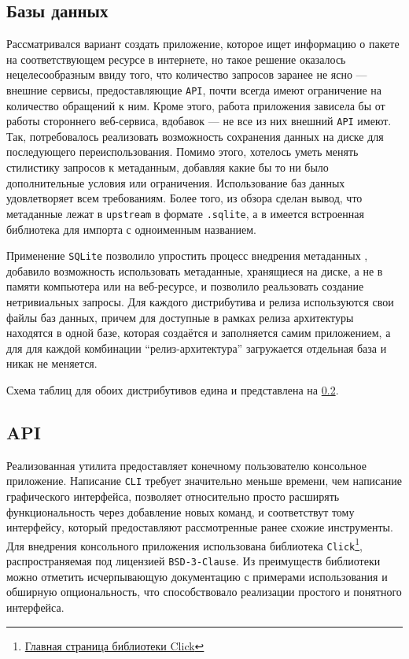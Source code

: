 \subsection{Базы данных}
Рассматривался вариант создать приложение, которое ищет информацию о пакете на соответствующем ресурсе в интернете, но такое решение оказалось нецелесообразным ввиду того, что количество запросов заранее не ясно --- внешние сервисы, предоставляющие \texttt{API}, почти всегда имеют ограничение на количество обращений к ним. Кроме этого, работа приложения зависела бы от работы стороннего веб-сервиса, вдобавок --- не все из них внешний \texttt{API} имеют. Так, потребовалось реализовать возможность сохранения данных на диске для последующего переиспользования.
Помимо этого, хотелось уметь менять стилистику запросов к метаданным, добавляя какие бы то ни было дополнительные условия или ограничения. Использование баз данных удовлетворяет всем требованиям. Более того, из обзора сделан вывод, что метаданные {\fedora} лежат в \texttt{upstream} в формате \texttt{.sqlite}, а в {\python} имеется встроенная библиотека для импорта с одноименным названием.

Применение \texttt{SQLite} позволило упростить процесс внедрения метаданных {\fedora}, добавило возможность использовать метаданные, хранящиеся на диске, а не в памяти компьютера или на веб-ресурсе, и позволило реальзовать создание нетривиальных запросы.
Для каждого дистрибутива и релиза используются свои файлы баз данных, причем для {\ubuntu} доступные в рамках релиза архитектуры находятся в одной базе, которая создаётся и заполняется самим приложением, а для {\fedora} для каждой комбинации \enquote{релиз-архитектура} загружается отдельная база и никак не меняется.

Схема таблиц для обоих дистрибутивов едина и представлена на \ref{}.

\subsection{API}
Реализованная утилита предоставляет конечному пользователю консольное приложение.
Написание \texttt{CLI} требует значительно меньше времени, чем написание графического интерфейса, позволяет относительно просто расширять функциональность через добавление новых команд, и соответствут тому интерфейсу, который предоставляют рассмотренные ранее схожие инструменты.
Для внедрения консольного приложения использована библиотека \texttt{Click}\footnote{\href{https://click.palletsprojects.com/en/8.1.x/}{Главная страница библиотеки Click}}, распространяемая под лицензией \texttt{BSD-3-Clause}.
Из преимуществ библиотеки можно отметить исчерпывающую документацию с примерами использования и обширную опциональность, что способствовало реализации простого и понятного интерфейса.

